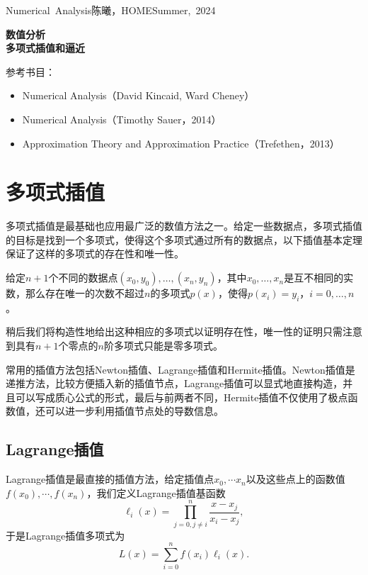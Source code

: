 \documentclass[a4paper,10pt]{ctexart}
\begin{document}
\hfill\vbox{\hbox{Numerical Analysis}\hbox{陈曦，HOME}\hbox{Summer, 2024}}

\begin{center}\Large
    \textbf{数值分析}\\{\normalsize\bf {多项式插值和逼近}}
\end{center}
\vskip 30pt
\small {参考书目：
\begin{itemize}
    \item Numerical Analysis（David Kincaid, Ward Cheney）
    \item Numerical Analysis（Timothy Sauer，2014）
    \item Approximation Theory and Approximation Practice（Trefethen，2013）
\end{itemize}}
\vskip 30pt

\section{多项式插值}
多项式插值是最基础也应用最广泛的数值方法之一。给定一些数据点，多项式插值的目标是找到一个多项式，使得这个多项式通过所有的数据点，以下插值基本定理保证了这样的多项式的存在性和唯一性。
\begin{theorem}
    给定$n+1$个不同的数据点$(x_0,y_0),\ldots,(x_n,y_n)$，其中$x_0,\ldots,x_n$是互不相同的实数，那么存在唯一的次数不超过$n$的多项式$p(x)$，使得$p(x_i)=y_i$，$i=0,\ldots,n$。
\end{theorem}
\noindent 稍后我们将构造性地给出这种相应的多项式以证明存在性，唯一性的证明只需注意到具有$ n+1 $个零点的$ n $阶多项式只能是零多项式。

常用的插值方法包括Newton插值、Lagrange插值和Hermite插值。Newton插值是递推方法，比较方便插入新的插值节点，Lagrange插值可以显式地直接构造，并且可以写成质心公式的形式，最后与前两者不同，Hermite插值不仅使用了极点函数值，还可以进一步利用插值节点处的导数信息。

\subsection{Lagrange插值}
Lagrange插值是最直接的插值方法，给定插值点$ x_0,\cdots x_n $以及这些点上的函数值$ f(x_0),\cdots ,f(x_n) $，我们定义Lagrange插值基函数
\begin{equation}
    \ell_i(x)=\prod_{j=0,j\neq i}^{n}\frac{x-x_j}{x_i-x_j},
\end{equation}
于是Lagrange插值多项式为
\begin{equation}
    L(x)=\sum_{i=0}^{n}f(x_i)\ell_i(x).
\end{equation}
\end{document}
